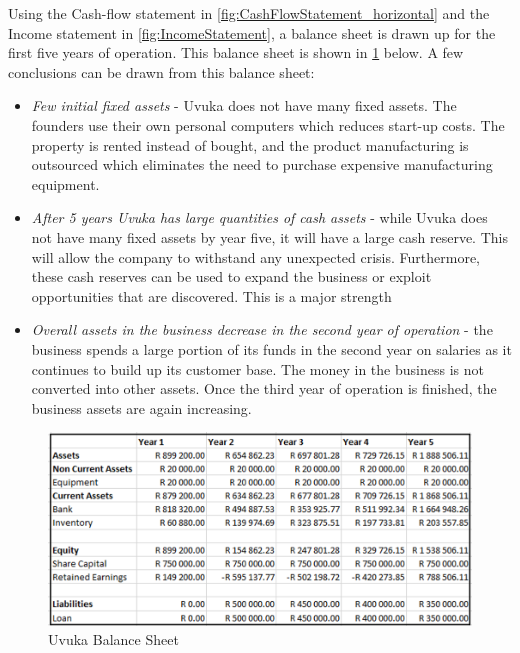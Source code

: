Using the Cash-flow statement in \cref{fig:CashFlowStatement_horizontal} and the Income statement in \cref{fig:IncomeStatement}, a balance sheet is drawn up for the first five years of operation. This balance sheet is shown in \cref{fig:BalanceSheet} below. A few conclusions can be drawn from this balance sheet:
\begin{itemize}
	\item \textit{Few initial fixed assets} - Uvuka does not have many fixed assets. The founders use their own personal computers which reduces start-up costs. The property is rented instead of bought, and the product manufacturing is outsourced which eliminates the need to purchase expensive manufacturing equipment.  
    \item \textit{After 5 years Uvuka has large quantities of cash assets} - while Uvuka does not have many fixed assets by year five, it will have a large cash reserve. This will allow the company to withstand any unexpected crisis. Furthermore, these cash reserves can be used to expand the business or exploit opportunities that are discovered. This is a major strength
    \item \textit{Overall assets in the business decrease in the second year of operation} - the business spends a large portion of its funds in the second year on salaries as it continues to build up its customer base. The money in the business is not converted into other assets. Once the third year of operation is finished, the business assets are again increasing.
    
\end{itemize}

\begin{figure}[H]
    \centering
    \includegraphics[width=1\textwidth]{images/BalanceSheet}
    \vskip10pt
    \caption[Uvuka Balance Sheet]{Uvuka Balance Sheet}
    \label{fig:BalanceSheet}
\end{figure}


